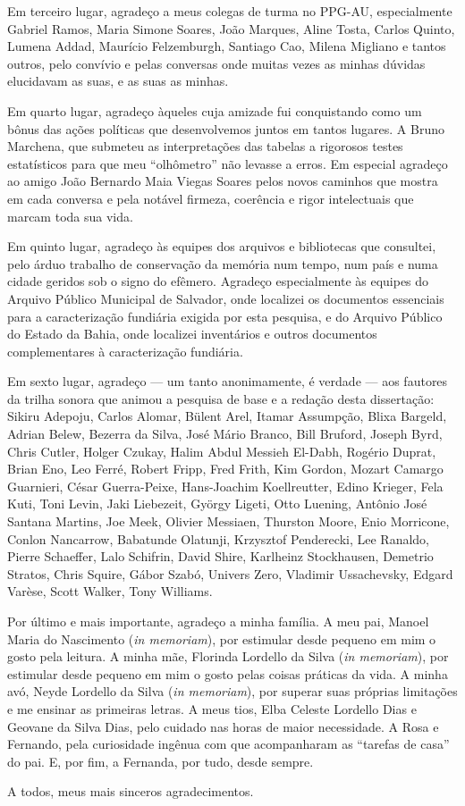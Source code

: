 \begin{agradecimentos}
Em terceiro lugar, agradeço a meus colegas de turma no PPG-AU, especialmente Gabriel Ramos, Maria Simone Soares, João Marques, Aline Tosta, Carlos Quinto, Lumena Addad, Maurício Felzemburgh, Santiago Cao, Milena Migliano e tantos outros, pelo convívio e pelas conversas onde muitas vezes as minhas dúvidas elucidavam as suas, e as suas as minhas.

Em quarto lugar, agradeço àqueles cuja amizade fui conquistando como um bônus das ações políticas que desenvolvemos juntos em tantos lugares. A Bruno Marchena, que submeteu as interpretações das tabelas a rigorosos testes estatísticos para que meu ``olhômetro'' não levasse a erros. Em especial agradeço ao amigo João Bernardo Maia Viegas Soares pelos novos caminhos que mostra em cada conversa e pela notável firmeza, coerência e rigor intelectuais que marcam toda sua vida.

Em quinto lugar, agradeço às equipes dos arquivos e bibliotecas que consultei, pelo árduo trabalho de conservação da memória num tempo, num país e numa cidade geridos sob o signo do efêmero. Agradeço especialmente às equipes do Arquivo Público Municipal de Salvador, onde localizei os documentos essenciais para a caracterização fundiária exigida por esta pesquisa, e do Arquivo Público do Estado da Bahia, onde localizei inventários e outros documentos complementares à caracterização fundiária.

Em sexto lugar, agradeço --- um tanto anonimamente, é verdade --- aos fautores da trilha sonora que animou a pesquisa de base e a redação desta dissertação: Sikiru Adepoju, Carlos Alomar, Bülent Arel, Itamar Assumpção, Blixa Bargeld, Adrian Belew, Bezerra da Silva, José Mário Branco, Bill Bruford, Joseph Byrd, Chris Cutler, Holger Czukay, Halim Abdul Messieh El-Dabh, Rogério Duprat, Brian Eno, Leo Ferré, Robert Fripp, Fred Frith, Kim Gordon, Mozart Camargo Guarnieri, César Guerra-Peixe, Hans-Joachim Koellreutter, Edino Krieger, Fela Kuti, Toni Levin, Jaki Liebezeit, György Ligeti, Otto Luening, Antônio José Santana Martins, Joe Meek, Olivier Messiaen, Thurston Moore, Enio Morricone, Conlon Nancarrow, Babatunde Olatunji, Krzysztof Penderecki, Lee Ranaldo, Pierre Schaeffer, Lalo Schifrin, David Shire, Karlheinz Stockhausen, Demetrio Stratos, Chris Squire, Gábor Szabó, Univers Zero, Vladimir Ussachevsky, Edgard Varèse, Scott Walker, Tony Williams. 

Por último e mais importante, agradeço a minha família. A meu pai, Manoel Maria do Nascimento (\textit{in memoriam}), por estimular desde pequeno em mim o gosto pela leitura. A minha mãe, Florinda Lordello da Silva (\textit{in memoriam}), por estimular desde pequeno em mim o gosto pelas coisas práticas da vida. A minha avó, Neyde Lordello da Silva (\textit{in memoriam}), por superar suas próprias limitações e me ensinar as primeiras letras. A meus tios, Elba Celeste Lordello Dias e Geovane da Silva Dias, pelo cuidado nas horas de maior necessidade. A Rosa e Fernando, pela curiosidade ingênua com que acompanharam as ``tarefas de casa'' do pai. E, por fim, a Fernanda, por tudo, desde sempre.

A todos, meus mais sinceros agradecimentos.

\end{agradecimentos}
